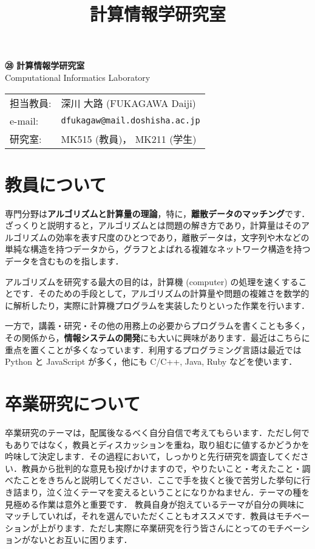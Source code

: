 \documentclass[uplatex,jis2004,a4paper,11pt]{jsarticle}
\title{計算情報学研究室}
\date{}
\renewcommand{\emph}[1]{\textbf{#1}}
\begin{document}
\begin{minipage}[t]{.45\textwidth}
\noindent
{\LARGE\bfseries\rmfamily ㉘ 計算情報学研究室}\\
\hspace{.4cm} Computational Informatics Laboratory
\end{minipage}
\begin{minipage}[t]{.45\textwidth}
\begin{tabular}{l@{ }l}
担当教員: & 深川 大路 (FUKAGAWA Daiji) \\
e-mail: & \texttt{dfukagaw@mail.doshisha.ac.jp} \\
研究室: & MK515 (教員)， MK211 (学生)
\end{tabular}
\end{minipage}


\section{教員について}

専門分野は\emph{アルゴリズムと計算量の理論}，特に，\emph{離散データのマッチング}です．
ざっくりと説明すると，アルゴリズムとは問題の解き方であり，計算量はそのアルゴリズムの効率を表す尺度のひとつであり，離散データは，文字列や木などの単純な構造を持つデータから，グラフとよばれる複雑なネットワーク構造を持つデータを含むものを指します．

アルゴリズムを研究する最大の目的は，計算機 (computer) の処理を速くすることです．そのための手段として，アルゴリズムの計算量や問題の複雑さを数学的に解析したり，実際に計算機プログラムを実装したりといった作業を行います．

一方で，講義・研究・その他の用務上の必要からプログラムを書くことも多く，その関係から，\emph{情報システムの開発}にも大いに興味があります．最近はこちらに重点を置くことが多くなっています．利用するプログラミング言語は最近では Python と JavaScript が多く，他にも C/C++, Java, Ruby などを使います．

\section{卒業研究について}

卒業研究のテーマは，配属後なるべく自分自信で考えてもらいます．ただし何でもありではなく，教員とディスカッションを重ね，取り組むに値するかどうかを吟味して決定します．その過程において，しっかりと先行研究を調査してください．教員から批判的な意見も投げかけますので，やりたいこと・考えたこと・調べたことをきちんと説明してください．ここで手を抜くと後で苦労した挙句に行き詰まり，泣く泣くテーマを変えるということになりかねません．テーマの種を見極める作業は意外と重要です．
教員自身が抱えているテーマが自分の興味にマッチしていれば，それを選んでいただくこともオススメです．教員はモチベーションが上がります．ただし実際に卒業研究を行う皆さんにとってのモチベーションがないとお互いに困ります．
\end{document}
